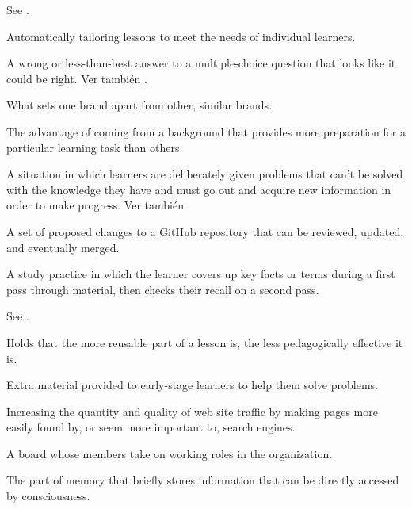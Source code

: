 \begin{description}
 See .

 Automatically tailoring
lessons to meet the needs of individual learners.

 A wrong or less-than-best
answer to a multiple-choice question that looks like it could be right. Ver también
.

 What sets one brand apart from other,
similar brands.

 The advantage of coming
from a background that provides more preparation for a particular learning task
than others.

 A situation in which learners
are deliberately given problems that can't be solved with the knowledge they
have and must go out and acquire new information in order to make progress.
Ver también .

 A set of proposed changes to a GitHub
repository that can be reviewed, updated, and eventually merged.

 A study practice in which
the learner covers up key facts or terms during a first pass through material,
then checks their recall on a second pass.

See .

 Holds that the more reusable
part of a lesson is, the less pedagogically effective it is.

 Extra material provided to early-stage
learners to help them solve problems.

 Increasing the quantity and quality
of web site traffic by making pages more easily found by, or seem more important
to, search engines.

 A board whose members take on working roles
in the organization.

 The part of memory that briefly
stores information that can be directly accessed by consciousness.


\end{description}
